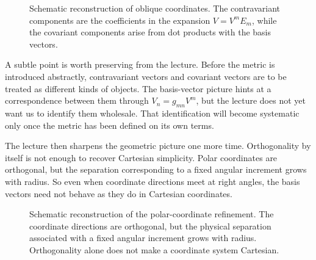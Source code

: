 \begin{figure}[t]
\centering
{}
\caption{Schematic reconstruction of oblique coordinates. The contravariant components are the coefficients in the expansion \(V=V^mE_m\), while the covariant components arise from dot products with the basis vectors.}
\end{figure}

A subtle point is worth preserving from the lecture. Before the metric is introduced abstractly, contravariant vectors and covariant vectors are to be treated as different kinds of objects. The basis-vector picture hints at a correspondence between them through \(V_n=g_{mn}V^m\), but the lecture does not yet want us to identify them wholesale. That identification will become systematic only once the metric has been defined on its own terms.

The lecture then sharpens the geometric picture one more time. Orthogonality by itself is not enough to recover Cartesian simplicity. Polar coordinates are orthogonal, but the separation corresponding to a fixed angular increment grows with radius. So even when coordinate directions meet at right angles, the basis vectors need not behave as they do in Cartesian coordinates.

\begin{figure}[t]
\centering
{}
\caption{Schematic reconstruction of the polar-coordinate refinement. The coordinate directions are orthogonal, but the physical separation associated with a fixed angular increment grows with radius. Orthogonality alone does not make a coordinate system Cartesian.}
\end{figure}

